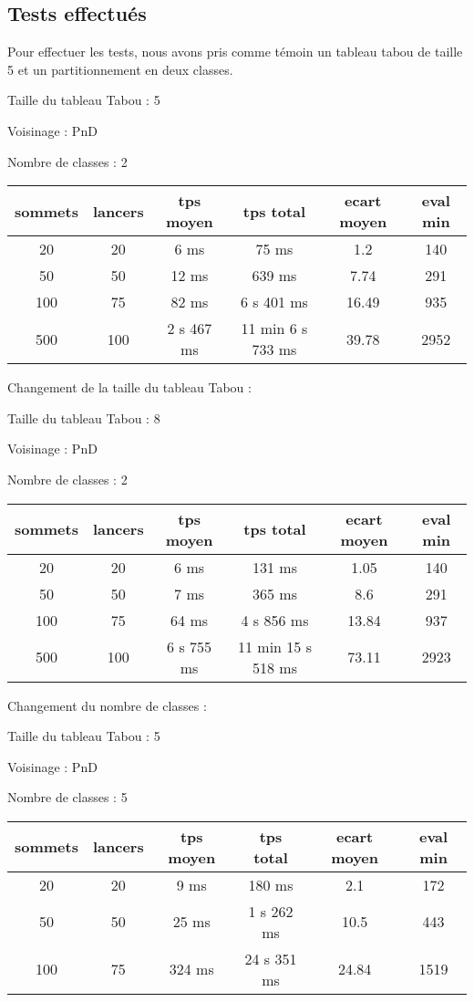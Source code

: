 \documentclass[12pt]{article}
\begin{document}
\subsection{Tests effectués}
Pour effectuer les tests, nous avons pris comme témoin un tableau tabou de taille 5 et un partitionnement en deux classes.

\bigskip

Taille du tableau Tabou : 5

Voisinage : PnD

Nombre de classes : 2
\bigskip

\begin{tabular}{|c|c|c|c|c|c|}
	\hline 
	sommets & lancers & tps moyen & tps total & ecart moyen & eval min\\
	\hline
	20 & 20 & 6 ms & 75 ms & 1.2 & 140 \\
	\hline
	 50 & 50 & 12 ms & 639 ms & 7.74 & 291 \\
	\hline
	 100 & 75 & 82 ms & 6 s 401 ms & 16.49 & 935 \\
	\hline
	 500 & 100 & 2 s 467 ms & 11 min 6 s 733 ms & 39.78 & 2952 \\
	\hline
\end{tabular}
\bigskip

Changement de la taille du tableau Tabou :

Taille du tableau Tabou : 8

Voisinage : PnD

Nombre de classes : 2
\bigskip

\begin{tabular}{|c|c|c|c|c|c|}
	\hline 
	sommets & lancers & tps moyen & tps total & ecart moyen & eval min\\
	\hline
	20 & 20 & 6 ms & 131 ms & 1.05 & 140 \\
	\hline
	 50  &  50  &   7  ms   &  365  ms   &  8.6   &   291  \\
	\hline
	 100  &  75  &  64  ms   &  4 s  856  ms    &  13.84   &   937  \\
	\hline
	 500 & 100 & 6 s 755 ms & 11 min 15 s 518 ms & 73.11 & 2923 \\
	\hline
\end{tabular}
\bigskip

Changement du nombre de classes :

Taille du tableau Tabou : 5

Voisinage : PnD

Nombre de classes : 5
\bigskip

\begin{tabular}{|c|c|c|c|c|c|}
	\hline 
	sommets & lancers & tps moyen & tps total & ecart moyen & eval min\\
	\hline
	20 & 20 & 9 ms & 180 ms & 2.1 & 172 \\
	\hline
	 50  &  50  & 25 ms   &  1  s  262  ms   &   10.5  &   443  \\
	\hline
	 100  &  75  & 324  ms   &  24 s  351  ms    &  24.84   &   1519  \\
	\hline

\end{tabular}
\bigskip
\end{document}
